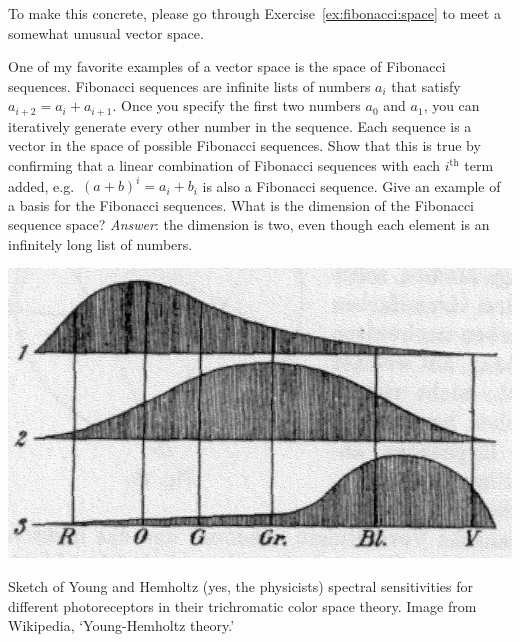 \documentclass[12pt, oneside]{report}    %
\begin{document}
To make this concrete, please go through Exercise~\ref{ex:fibonacci:space} to meet a somewhat unusual vector space.
\begin{exercise}\label{ex:fibonacci:space}
One of my favorite examples of a vector space is the space of Fibonacci sequences. Fibonacci sequences are infinite lists of numbers $a_i$ that satisfy $a_{i+2} = a_i+a_{i+1}$. Once you specify the first two numbers $a_0$ and $a_1$, you can iteratively generate every other number in the sequence. Each sequence is a vector in the space of possible Fibonacci sequences. Show that this is true by confirming that a linear combination of Fibonacci sequences with each $i^\text{th}$ term added, e.g.\ $(a+b)^i = a_i+b_i$ is also a Fibonacci sequence. Give an example of a basis for the Fibonacci sequences. What is the dimension of the Fibonacci sequence space? \emph{Answer}: the dimension is two, even though each element is an infinitely long list of numbers.
\end{exercise}
\begin{marginfigure}%
    \includegraphics[width=\textwidth]{figures/YoungHelm.jpg}
    \caption{Sketch of Young and Hemholtz (yes, the physicists) spectral sensitivities for different photoreceptors in their trichromatic color space theory. Image from Wikipedia, `Young-Hemholtz theory.'}
    \label{fig:young:hemholtz}
\end{marginfigure}
\end{document}
